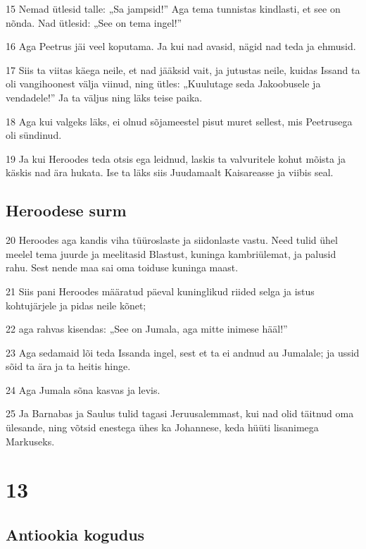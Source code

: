 \par 15 Nemad ütlesid talle: „Sa jampsid!” Aga tema tunnistas kindlasti, et see on nõnda. Nad ütlesid: „See on tema ingel!”
\par 16 Aga Peetrus jäi veel koputama. Ja kui nad avasid, nägid nad teda ja ehmusid.
\par 17 Siis ta viitas käega neile, et nad jääksid vait, ja jutustas neile, kuidas Issand ta oli vangihoonest välja viinud, ning ütles: „Kuulutage seda Jakoobusele ja vendadele!” Ja ta väljus ning läks teise paika.
\par 18 Aga kui valgeks läks, ei olnud sõjameestel pisut muret sellest, mis Peetrusega oli sündinud.
\par 19 Ja kui Heroodes teda otsis ega leidnud, laskis ta valvuritele kohut mõista ja käskis nad ära hukata. Ise ta läks siis Juudamaalt Kaisareasse ja viibis seal.

\section*{Heroodese surm}

\par 20 Heroodes aga kandis viha tüüroslaste ja siidonlaste vastu. Need tulid ühel meelel tema juurde ja meelitasid Blastust, kuninga kambriülemat, ja palusid rahu. Sest nende maa sai oma toiduse kuninga maast.
\par 21 Siis pani Heroodes määratud päeval kuninglikud riided selga ja istus kohtujärjele ja pidas neile kõnet;
\par 22 aga rahvas kisendas: „See on Jumala, aga mitte inimese hääl!”
\par 23 Aga sedamaid lõi teda Issanda ingel, sest et ta ei andnud au Jumalale; ja ussid sõid ta ära ja ta heitis hinge.
\par 24 Aga Jumala sõna kasvas ja levis.
\par 25 Ja Barnabas ja Saulus tulid tagasi Jeruusalemmast, kui nad olid täitnud oma ülesande, ning võtsid enestega ühes ka Johannese, keda hüüti lisanimega Markuseks.



\chapter{13}

\section*{Antiookia kogudus}

